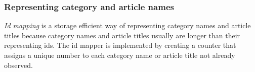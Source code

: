 \subsubsection{Representing category and article names}
\emph{Id mapping} is a storage efficient way of representing category names and article titles because category names and article titles usually are longer than their representing ids. The id mapper is implemented by creating a counter that assigns a unique number to each category name or article title not already observed. 

